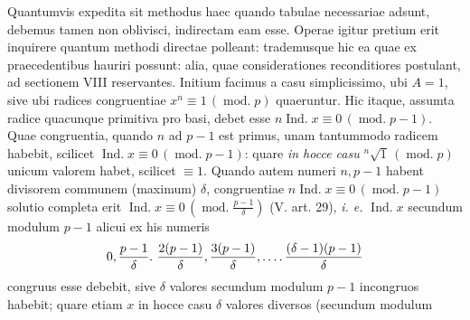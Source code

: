 Quantumvis expedita sit methodus haec quando tabulae necessariae adsunt, debemus tamen non oblivisci, indirectam eam esse. Operae igitur pretium erit inquirere quantum methodi directae polleant: trademusque hic ea quae ex praecedentibus hauriri possunt: alia, quae considerationes reconditiores postulant, ad sectionem VIII reservantes. Initium facimus a casu simplicissimo, ubi $A=1$, sive ubi radices congruentiae $x^n\equiv1\,(\operatorname{mod.}p)$ quaeruntur. Hic itaque, assumta radice quacunque primitiva pro basi, debet esse $n\operatorname{Ind.}x\equiv0\,(\operatorname{mod.}p-1)$. Quae congruentia, quando $n$ ad $p-1$ est primus, unam tantummodo radicem habebit, scilicet $\operatorname{Ind.}x\equiv0\,(\operatorname{mod.}p-1)$: quare \emph{in hocce casu} ${}^{n}\!\surd1\,(\operatorname{mod.}p)$ unicum valorem habet, scilicet $\equiv1$. Quando autem numeri $n,p-1$ habent divisorem communem (maximum) $\delta$, congruentiae $n\operatorname{Ind.}x\equiv0\,(\operatorname{mod.}p-1)$ solutio completa erit $\operatorname{Ind.}x\equiv0\,(\operatorname{mod.}\frac{p-1}{\delta})$ (V. art. 29), \emph{i. e.} $\operatorname{Ind.}x$ secundum modulum $p-1$ alicui ex his numeris
\[0,\frac{p-1}{\delta}.\ \frac{2(p-1)}{\delta},\frac{3(p-1)}{\delta},\GaussFourDots\frac{(\delta-1)(p-1)}{\delta}\]
congruus esse debebit, sive $\delta$ valores secundum modulum $p-1$ incongruos habebit; quare etiam $x$ in hocce casu $\delta$ valores diversos (secundum modulum
